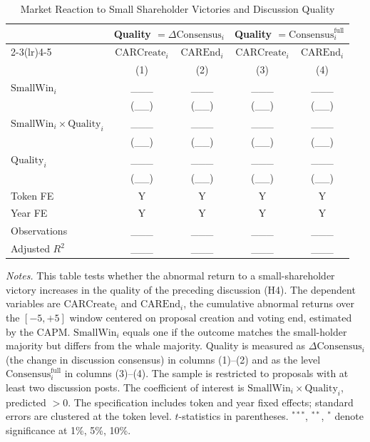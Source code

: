 \documentclass[11pt]{article}
\newcommand{\SmallWin}{\mathrm{SmallWin}}
\newcommand{\Cons}{\Delta\mathrm{Consensus}}
\newcommand{\ConsL}{\mathrm{Consensus}^{\mathrm{full}}}
\begin{document}
\begin{table}[h]
\centering
\begin{threeparttable}
\caption{Market Reaction to Small Shareholder Victories and Discussion Quality}
\label{tab:interaction}
\small
\begin{tabular}{lcccc}
\toprule
 & \multicolumn{2}{c}{Quality $=\Cons_i$} & \multicolumn{2}{c}{Quality $=\ConsL_i$} \\
\cmidrule(lr){2-3}\cmidrule(lr){4-5}
 & $\mathrm{CARCreate}_i$ & $\mathrm{CAREnd}_i$ & $\mathrm{CARCreate}_i$ & $\mathrm{CAREnd}_i$ \\
 & (1) & (2) & (3) & (4) \\
\midrule
$\SmallWin_i$                    & \_\_\_ & \_\_\_ & \_\_\_ & \_\_\_ \\
                                 & (\_\_) & (\_\_) & (\_\_) & (\_\_) \\[2pt]
$\SmallWin_i \times \mathrm{Quality}_i$ & \_\_\_ & \_\_\_ & \_\_\_ & \_\_\_ \\
                                 & (\_\_) & (\_\_) & (\_\_) & (\_\_) \\[2pt]
$\mathrm{Quality}_i$             & \_\_\_ & \_\_\_ & \_\_\_ & \_\_\_ \\
                                 & (\_\_) & (\_\_) & (\_\_) & (\_\_) \\
\midrule
Token FE   & Y & Y & Y & Y \\
Year FE    & Y & Y & Y & Y \\
Observations & \_\_\_ & \_\_\_ & \_\_\_ & \_\_\_ \\
Adjusted $R^2$ & \_\_\_ & \_\_\_ & \_\_\_ & \_\_\_ \\
\bottomrule
\end{tabular}
\begin{tablenotes}[flushleft]
\footnotesize
\item \textit{Notes.} This table tests whether the abnormal return to a small-shareholder
victory increases in the quality of the preceding discussion (H4). The dependent
variables are $\mathrm{CARCreate}_i$ and $\mathrm{CAREnd}_i$, the cumulative abnormal
returns over the $[-5,+5]$ window centered on proposal creation and voting end,
estimated by the CAPM. $\SmallWin_i$ equals one if the outcome matches the small-holder
majority but differs from the whale majority. Quality is measured as $\Cons_i$ (the
change in discussion consensus) in columns (1)--(2) and as the level $\ConsL_i$ in
columns (3)--(4). The sample is restricted to proposals with at least two discussion
posts. The coefficient of interest is $\SmallWin_i \times \mathrm{Quality}_i$, predicted
$> 0$. The specification includes token and year fixed effects; standard errors are
clustered at the token level. $t$-statistics in parentheses.
$^{***}$, $^{**}$, $^{*}$ denote significance at 1\%, 5\%, 10\%.
\end{tablenotes}
\end{threeparttable}
\end{table}
\end{document}

